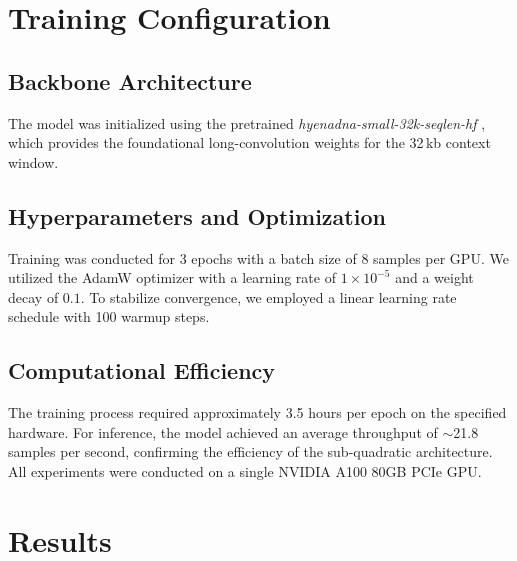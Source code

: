 \documentclass{bioinfo}
\begin{document}
\section{Training Configuration}

\subsection{Backbone Architecture}
The model was initialized using the pretrained \textit{hyenadna-small-32k-seqlen-hf} \cite{hyenadna}, which provides the foundational long-convolution weights for the 32\,kb context window.

\subsection{Hyperparameters and Optimization}
Training was conducted for 3 epochs with a batch size of 8 samples per GPU. We utilized the AdamW optimizer with a learning rate of $1\times10^{-5}$ and a weight decay of $0.1$. To stabilize convergence, we employed a linear learning rate schedule with 100 warmup steps.

\subsection{Computational Efficiency}
The training process required approximately 3.5 hours per epoch on the specified hardware. For inference, the model achieved an average throughput of $\sim$21.8 samples per second, confirming the efficiency of the sub-quadratic architecture.
All experiments were conducted on a single NVIDIA A100 80GB PCIe GPU.
\section{Results}
\end{document}
